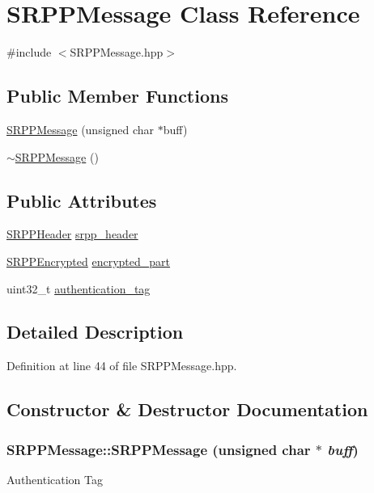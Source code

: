\hypertarget{class_s_r_p_p_message}{
\section{SRPPMessage Class Reference}
\label{class_s_r_p_p_message}
}


{\ttfamily \#include $<$SRPPMessage.hpp$>$}

\subsection*{Public Member Functions}
\begin{DoxyCompactItemize}
\item 
\hyperlink{class_s_r_p_p_message_a1028cf4e3c6af0ef494a394b2717e97b}{SRPPMessage} (unsigned char $\ast$buff)
\item 
\hyperlink{class_s_r_p_p_message_ad9f1e4ee16c1d6de798da5d8a5bafc37}{$\sim$SRPPMessage} ()
\end{DoxyCompactItemize}
\subsection*{Public Attributes}
\begin{DoxyCompactItemize}
\item 
\hyperlink{struct_s_r_p_p_header}{SRPPHeader} \hyperlink{class_s_r_p_p_message_a690a8a2664ee4c03daef67bcd9f26990}{srpp\_\-header}
\item 
\hyperlink{struct_s_r_p_p_encrypted}{SRPPEncrypted} \hyperlink{class_s_r_p_p_message_a73d0173615ff24ee5c920e2a9218a047}{encrypted\_\-part}
\item 
uint32\_\-t \hyperlink{class_s_r_p_p_message_ab4f881f399364dfa40d003bd19ffa411}{authentication\_\-tag}
\end{DoxyCompactItemize}


\subsection{Detailed Description}


Definition at line 44 of file SRPPMessage.hpp.



\subsection{Constructor \& Destructor Documentation}
\hypertarget{class_s_r_p_p_message_a1028cf4e3c6af0ef494a394b2717e97b}{
\subsubsection[{SRPPMessage}]{\setlength{\rightskip}{0pt plus 5cm}SRPPMessage::SRPPMessage (unsigned char $\ast$ {\em buff})}}
\label{class_s_r_p_p_message_a1028cf4e3c6af0ef494a394b2717e97b}
Authentication Tag 

